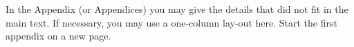 In the Appendix (or Appendices) you may give the details that did not fit in the main text. If necessary, you may use a one-column lay-out here. Start the first appendix on a new page.